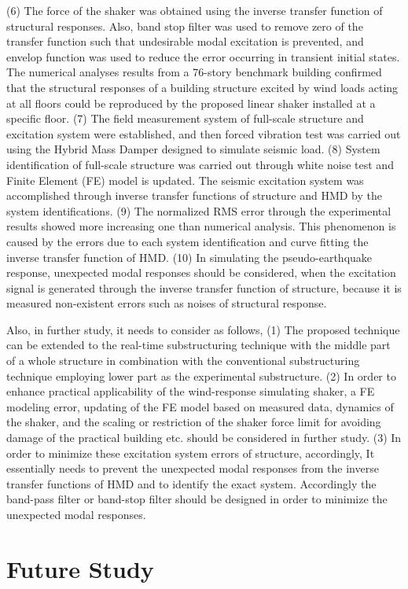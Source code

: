 (6) The force of the shaker was obtained using the inverse transfer function of structural responses. Also, band stop filter was used to remove zero of the transfer function such that undesirable modal excitation is prevented, and envelop function was used to reduce the error occurring in transient initial states. The numerical analyses results from a 76-story benchmark building confirmed that the structural responses of a building structure excited by wind loads acting at all floors could be reproduced by the proposed linear shaker installed at a specific floor.
(7) The field measurement system of full-scale structure and excitation system were established, and then forced vibration test was carried out using the Hybrid Mass Damper designed to simulate seismic load. 
(8) System identification of full-scale structure was carried out through white noise test and Finite Element (FE) model is updated. The seismic excitation system was accomplished through inverse transfer functions of structure and HMD by the system identifications.
(9) The normalized RMS error through the experimental results showed more increasing one than numerical analysis. This phenomenon is caused by the errors due to each system identification and curve fitting the inverse transfer function of HMD.
(10) In simulating the pseudo-earthquake response, unexpected modal responses should be considered, when the excitation signal is generated through the inverse transfer function of structure, because it is measured non-existent errors such as noises of structural response.

Also, in further study, it needs to consider as follows,
(1) The proposed technique can be extended to the real-time substructuring technique with the middle part of a whole structure in combination with the conventional substructuring technique employing lower part as the experimental substructure.
(2) In order to enhance practical applicability of the wind-response simulating shaker, a FE modeling error, updating of the FE model based on measured data, dynamics of the shaker, and the scaling or restriction of the shaker force limit for avoiding damage of the practical building etc. should be considered in further study.
(3) In order to minimize these excitation system errors of structure, accordingly, It essentially needs to prevent the unexpected modal responses from the inverse transfer functions of HMD and to identify the exact system. Accordingly the band-pass filter or band-stop filter should be designed in order to minimize the unexpected modal responses.


\section{Future Study}